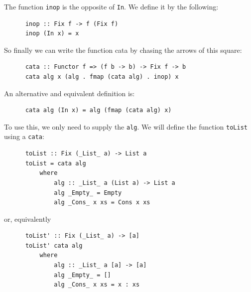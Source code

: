 \documentclass[a4paper,12pt]{article}
\theoremstyle{remark}
\begin{document}
  \begin{figure}[H]
    \centering
  \end{figure}

  The function \lstinline{inop} is the opposite of \lstinline{In}. We define it by the following:

  \begin{lstlisting}
      inop :: Fix f -> f (Fix f)
      inop (In x) = x  \end{lstlisting}

  So finally we can write the function cata by chasing the arrows of this square:

  \begin{lstlisting}
      cata :: Functor f => (f b -> b) -> Fix f -> b
      cata alg x (alg . fmap (cata alg) . inop) x  \end{lstlisting}

  An alternative and equivalent definition is:

  \begin{lstlisting}
      cata alg (In x) = alg (fmap (cata alg) x)  \end{lstlisting}

  To use this, we only need to supply the \lstinline{alg}. We will define the function \lstinline{toList}
  using a \lstinline{cata}:

  \begin{lstlisting}
      toList :: Fix (_List_ a) -> List a
      toList = cata alg
          where
              alg :: _List_ a (List a) -> List a
              alg _Empty_ = Empty
              alg _Cons_ x xs = Cons x xs  \end{lstlisting}

  or, equivalently

  \begin{lstlisting}
      toList' :: Fix (_List_ a) -> [a]
      toList' cata alg
          where
              alg :: _List_ a [a] -> [a]
              alg _Empty_ = []
              alg _Cons_ x xs = x : xs  \end{lstlisting}
\end{document}
